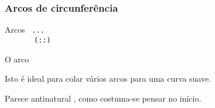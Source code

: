 \begin{frame}
  \frametitle{Arcos de circunferência}
  \begin{block}{Arcos}
    \texttt{\purple{\string\draw} ... \\
      \mbox{}\ \ \ \ \ \  (::)}\bigskip

    O arco \medskip

    Isto é ideal para colar
    vários arcos para uma curva suave.
  \end{block}

\bigskip

  \begin{alertblock}{Parece antinatural}
    , como costuma-se pensar no início.
  \end{alertblock}

\end{frame}

